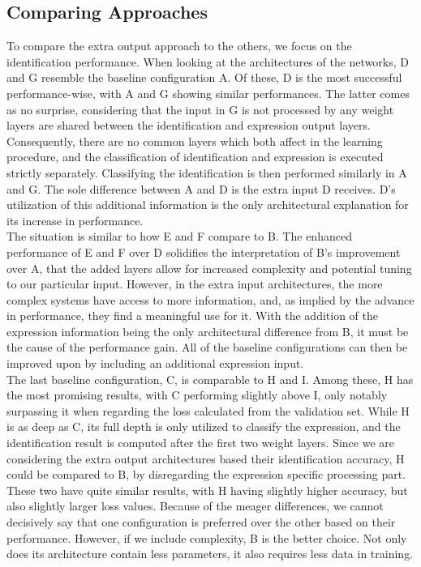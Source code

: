 \subsection{Comparing Approaches}

To compare the extra output approach to the others, we focus on the identification performance. When looking at the architectures of the networks, D and G resemble the baseline configuration A. Of these, D is the most successful performance-wise, with A and G showing similar performances. The latter comes as no surprise, considering that the input in G is not processed by any weight layers are shared between the identification and expression output layers. Consequently, there are no common layers which both affect in the learning procedure, and the classification of identification and expression is executed strictly separately. Classifying the identification is then performed similarly in A and G. The sole difference between A and D is the extra input D receives. D's utilization of this additional information is the only architectural explanation for its increase in performance. \\

\noindent The situation is similar to how E and F compare to B. The enhanced performance of E and F over D solidifies the interpretation of B's improvement over A, that the added layers allow for increased complexity and potential tuning to our particular input. However, in the extra input architectures, the more complex systems have access to more information, and, as implied by the advance in performance, they find a meaningful use for it. With the addition of the expression information being the only architectural difference from B, it must be the cause of the performance gain. All of the baseline configurations can then be improved upon by including an additional expression input. \\

\noindent The last baseline configuration, C, is comparable to H and I. Among these, H has the most promising results, with C performing slightly above I, only notably surpassing it when regarding the loss calculated from the validation set. While H is as deep as C, its full depth is only utilized to classify the expression, and the identification result is computed after the first two weight layers. Since we are considering the extra output architectures based their identification accuracy, H could be compared to B, by disregarding the expression specific processing part. These two have quite similar results, with H having slightly higher accuracy, but also slightly larger loss values. Because of the meager differences, we cannot decisively say that one configuration is preferred over the other based on their performance. However, if we include complexity, B is the better choice. Not only does its architecture contain less parameters, it also requires less data in training. \\

